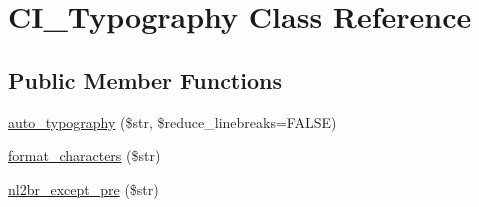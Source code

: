 \hypertarget{class_c_i___typography}{}\section{C\+I\+\_\+\+Typography Class Reference}
\label{class_c_i___typography}
\subsection*{Public Member Functions}
\begin{DoxyCompactItemize}
\item 
\hyperlink{class_c_i___typography_a24c284b560f34d6c7fad07e36baaa024}{auto\+\_\+typography} (\$str, \$reduce\+\_\+linebreaks=F\+A\+L\+S\+E)
\item 
\hyperlink{class_c_i___typography_a45df135c8811c2b27085dbdfd05a1eed}{format\+\_\+characters} (\$str)
\item 
\hyperlink{class_c_i___typography_af9db9732eaa94a62b3a3ccc7f6bf860b}{nl2br\+\_\+except\+\_\+pre} (\$str)
\end{DoxyCompactItemize}
